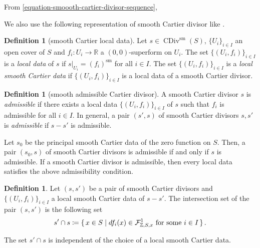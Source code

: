 \documentclass[a4paper,dvipdfmx,reqno,12pt]{amsart}
\theoremstyle{definition}
\newtheorem{definition}[theorem]{Definition}
\newcommand{\deq}{\coloneqq}
\newcommand{\opn}[1]{\operatorname{#1}}
\numberwithin{equation}{section}
\begin{document}
From \cref{equation-smoooth-cartier-divisor-sequence},



We also use the following representation of 
smooth Cartier divisor like 
\cite[Definition 4.0.12]{MR2810322}.



\begin{definition}[{smooth Cartier local data}]
Let $s\in \opn{CDiv}^{\mathrm{sm}}(S)$, 
$\{U_i\}_{i\in I}$ an open cover of $S$ and 
$f_i\colon U_i \to \mathbb{R}$ a $(0,0)$-superform
on $U_i$. The set 
$\{(U_i,f_i)\}_{i\in I}$ is 
a \emph{local data} of $s$ if 
$s|_{U_i}=(f_i)^{\mathrm{sm}}$ for all 
$i\in I$. The set $\{(U_i,f_i)\}_{i\in I}$ is a
\emph{local smooth Cartier data} if 
$\{(U_i,f_i)\}_{i\in I}$ is a local data of a smooth
Cartier divisor.
\end{definition}

\begin{definition}[{smooth admissible Cartier divisor}]
\label{definition-admissible-smooth-cartier-divisor}
A smooth Cartier divisor $s$ is \emph{admissible} 
if there exists a local data $\{(U_i,f_i)\}_{i\in I}$ 
of $s$
such that $f_i$ is admissible for all $i\in I$. 
In general, a pair $(s',s)$ of smooth 
Cartier divisors $s,s'$ is 
\emph{admissible} if $s-s'$ is 
admissible. 
\end{definition}

Let $s_0$ be the principal smooth Cartier data of 
the zero function on $S$. Then, a pair 
$(s_0,s)$ of smooth Cartier divisors is admissible
if and only if $s$ is admissible.
If a smooth Cartier divisor is admissible, 
then every local data satisfies the above 
admissibility condition.

\begin{definition}
Let $(s,s')$ be a pair of smooth Cartier divisors and 
$\{(U_i,f_i)\}_{i\in I}$ a local smooth Cartier data
of $s-s'$. The intersection set of the pair 
$(s,s')$ is the following set
\begin{align}
s'\cap s\deq \set{x\in S \mid  df_i(x)\in 
\mathcal{F}^{1}_{\mathbb{Z},S,x} 
\text{ for some } i\in I}.
\end{align}
\end{definition}

The set $s'\cap s$ is independent of the choice of 
a local smooth Cartier data. 

\end{document}
